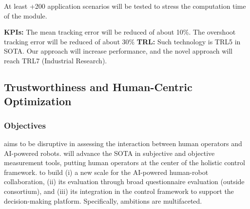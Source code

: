 At least +200 application scenarios will be tested to stress the
computation time of the module.

\textbf{KPIs:} The mean tracking error will be reduced of about 10\%.
The overshoot tracking error will be reduced of about 30\%
\textbf{\textbar{} TRL:} Such technology is TRL5 in SOTA. Our approach
will increase performance, and the novel approach will reach TRL7
(Industrial Research).

\clearpage
\subsection{Trustworthiness and Human-Centric
Optimization}\label{trustworthiness-and-human-centric-optimization}

\subsubsection{\texorpdfstring{Objectives
}{Objectives }}\label{objectives-3}

 aims to be disruptive in assessing the interaction
between human operators and AI-powered robots.  will
advance the SOTA in subjective and objective measurement tools, putting
human operators at the center of the holistic control framework.
 to build (i) a new scale for the AI-powered
human-robot collaboration, (ii) its evaluation through broad
questionnaire evaluation (outside consortium), and (iii) its integration
in the control framework to support the decision-making platform.
Specifically,  ambitions are
multifaceted.

